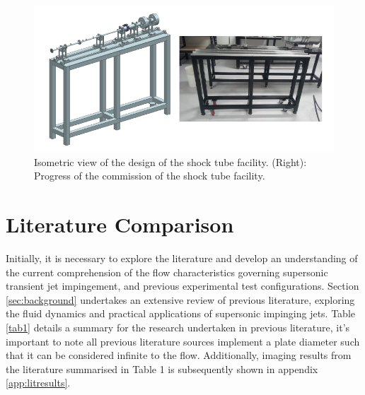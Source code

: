 \begin{figure}[H] 
	\centering
	\includegraphics[width=1\textwidth]{fig8.PNG} 
	\caption{Isometric view of the design of the shock tube facility. (Right): Progress of the commission
		of the shock tube facility.}
	\label{fig:8}
\end{figure}

\section{Literature Comparison}
Initially, it is necessary to explore the literature and develop an understanding of the current comprehension of the flow characteristics governing supersonic transient jet impingement, and previous experimental test configurations. Section \ref{sec:background} undertakes an extensive review of previous literature, exploring the fluid dynamics and practical applications of supersonic impinging jets. Table \ref{tab1} details a summary for the research undertaken in previous literature, it's important to note all previous literature sources implement a plate diameter such that it can be considered infinite to the flow. Additionally, imaging results from the literature summarised in Table 1 is subsequently shown in appendix \ref{app:litresults}.

